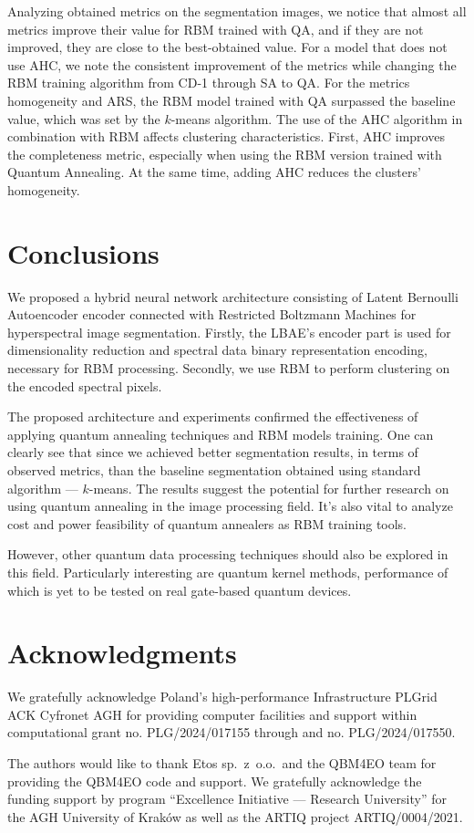 \documentclass[runningheads]{llncs}
\begin{document}
Analyzing obtained metrics on the segmentation images, we notice that almost all
metrics improve their value for RBM trained with QA, and if they are not
improved, they are close to the best-obtained value. For a model that does not
use AHC, we note the consistent improvement of the metrics while changing the
RBM training algorithm from CD-1 through SA to QA. For the metrics homogeneity
and ARS, the RBM model trained with QA surpassed the baseline value, which was
set by the $k$-means algorithm. The use of the AHC algorithm in combination with
RBM affects clustering characteristics. First, AHC improves the completeness
metric, especially when using the RBM version trained with Quantum Annealing. At
the same time, adding AHC reduces the clusters' homogeneity. 

\section{Conclusions}
We proposed a hybrid neural network architecture consisting of Latent Bernoulli
Autoencoder encoder connected with Restricted Boltzmann Machines for
hyperspectral image segmentation. Firstly, the LBAE's encoder part is used for
dimensionality reduction and spectral data binary representation encoding,
necessary for RBM processing. Secondly, we use RBM to perform clustering on the
encoded spectral pixels.

The proposed architecture and experiments confirmed the effectiveness of applying quantum annealing techniques and RBM models training. One can clearly
see that since we achieved better segmentation results, in terms of observed metrics, than the baseline segmentation obtained using standard algorithm --- $k$-means. The results suggest the potential for further research on using quantum annealing in the image processing field. It's also vital to analyze
cost and power feasibility of quantum annealers as RBM training tools.

However, other quantum data
processing techniques should also be explored in this field. Particularly
interesting are quantum kernel methods, performance of which is yet to be
tested on real gate-based quantum devices. 

\section*{Acknowledgments}\label{acknowledgments}
\sloppy
We gratefully acknowledge Poland's high-performance Infrastructure PLGrid ACK Cyfronet AGH for providing computer facilities and support within computational grant no. PLG/2024/017155 through and no. PLG/2024/017550.

The authors would like to thank Etos sp.\ z\ o.o.\ and the QBM4EO team for
providing the QBM4EO code and support. We gratefully acknowledge the funding
support by program ``Excellence Initiative — Research University'' for the AGH
University of Kraków as well as the ARTIQ project ARTIQ/0004/2021.

\printbibliography
\end{document}
